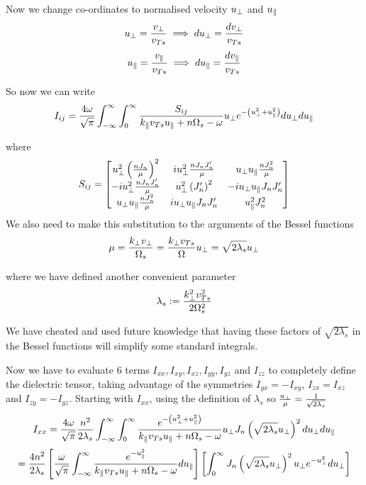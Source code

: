 Now we change co-ordinates to normalised velocity $u_\perp$ and $u_\parallel$
\begin{equation*}
	u_\perp = \frac{v_\perp}{v_{Ts}} \implies du_\perp = \frac{dv_\perp}{v_{Ts}}
\end{equation*}
\begin{equation*}
	u_\parallel = \frac{v_\parallel}{v_{Ts}} \implies du_\parallel = \frac{dv_\parallel}{v_{Ts}}
\end{equation*}

So now we can write 
\begin{equation}
	I_{ij} = \frac{4 \omega}{\sqrt{\pi}} \int_{-\infty}^\infty \int_0^\infty \frac{S_{ij}}{k_\parallel v_{Ts} u_\parallel + n\Omega_s - \omega} u_\perp e^{-\left(u_\perp^2 + u_\parallel^2\right)} du_\perp du_\parallel
\end{equation}

where
\begin{equation}
	S_{ij} =
	\begin{bmatrix}
		u_\perp^2 \left(\frac{nJ_n}{\mu}\right)^2 & iu_\perp^2 \frac{nJ_nJ_n'}{\mu} & u_\perp u_\parallel \frac{nJ_n^2}{\mu}\\
		- iu_\perp^2 \frac{nJ_nJ_n'}{\mu} & u_\perp^2 \left(J_n'\right)^2 & -i u_\perp u_\parallel J_n J_n'\\
		u_\perp u_\parallel \frac{nJ_n^2}{\mu}  & i u_\perp u_\parallel J_n J_n' & u_\parallel^2 J_n^2\\
	\end{bmatrix}
\end{equation}
We also need to make this substitution to the arguments of the Bessel functions
\begin{equation}
	\mu = \frac{k_\perp v_\perp}{\Omega_s} = \frac{k_\perp v_{Ts}}{\Omega} u_\perp = \sqrt{2 \lambda_s} u_\perp
\end{equation}
 
 where we have defined another convenient parameter
 \begin{equation}
 	\lambda_s := \frac{k_\perp^2 v_{Ts}^2}{2 \Omega_s^2}
 \end{equation}

We have cheated and used future knowledge that having these factors of $\sqrt{2 \lambda_s}$ in the Bessel functions will simplify some standard integrals.

Now we have to evaluate 6 terms $I_{xx} ,I_{xy}, I_{xz}, I_{yy}, I_{yz}$ and $I_{zz}$ to completely define the dielectric tensor, taking advantage of the symmetries $I_{yx} = -I_{xy}$, $I_{zx} = I_{xz}$ and $I_{zy} = -I_{yz}$. Starting with $I_{xx}$, using the definition of $\lambda_s$ so $\frac{u_\perp}{\mu} = \frac{1}{\sqrt{2 \lambda_s}}$
\begin{equation*}
	I_{xx} = \frac{4 \omega}{\sqrt{\pi}} \frac{n^2}{2\lambda_s} \int_{-\infty}^\infty \int_0^\infty \frac{e^{-\left(u_\perp^2 + u_\parallel^2\right)}}{k_\parallel v_{Ts} u_\parallel + n\Omega_s - \omega} u_\perp J_n \left( \sqrt{2 \lambda_s} u_\perp \right)^2 du_\perp du_\parallel
\end{equation*}
\begin{equation}
	= \frac{4 n^2}{2\lambda_s} \left[\frac{\omega}{\sqrt{\pi}} \int_{-\infty}^\infty \frac{e^{-u_\parallel^2}}{k_\parallel v_{Ts} u_\parallel + n\Omega_s - \omega} du_\parallel \right] \left[ \int_0^\infty J_n \left( \sqrt{2 \lambda_s} u_\perp \right)^2 u_\perp e^{-u_\perp^2} du_\perp \right]
\end{equation}

